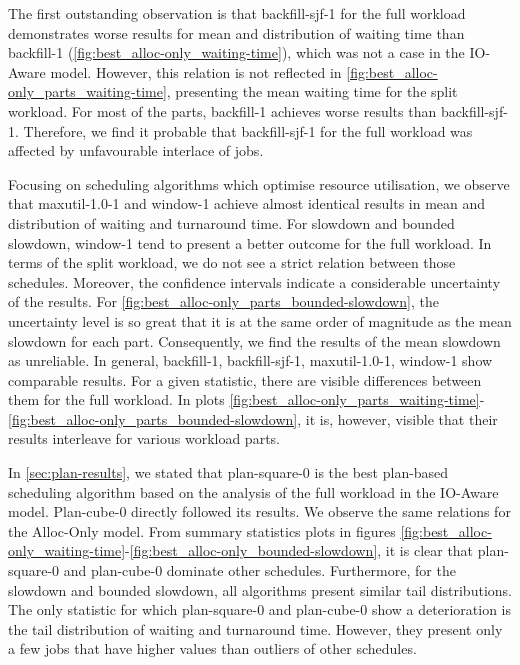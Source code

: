 \documentclass[thesis-en.tex]{subfiles}
\begin{document}
The first outstanding observation is that backfill-sjf-1 for the full workload demonstrates worse results for mean and distribution of waiting time than backfill-1 (\autoref{fig:best_alloc-only_waiting-time}), which was not a case in the IO-Aware model. However, this relation is not reflected in \autoref{fig:best_alloc-only_parts_waiting-time}, presenting the mean waiting time for the split workload. For most of the parts, backfill-1 achieves worse results than backfill-sjf-1. Therefore, we find it probable that backfill-sjf-1 for the full workload was affected by unfavourable interlace of jobs.

Focusing on scheduling algorithms which optimise resource utilisation, we observe that maxutil-1.0-1 and window-1 achieve almost identical results in mean and distribution of waiting and turnaround time. For slowdown and bounded slowdown, window-1 tend to present a better outcome for the full workload. In terms of the split workload, we do not see a strict relation between those schedules. Moreover, the confidence intervals indicate a considerable uncertainty of the results. For \autoref{fig:best_alloc-only_parts_bounded-slowdown}, the uncertainty level is so great that it is at the same order of magnitude as the mean slowdown for each part. Consequently, we find the results of the mean slowdown as unreliable. In general, backfill-1, backfill-sjf-1, maxutil-1.0-1, window-1 show comparable results. For a given statistic, there are visible differences between them for the full workload. In plots \ref{fig:best_alloc-only_parts_waiting-time}-\ref{fig:best_alloc-only_parts_bounded-slowdown}, it is, however, visible that their results interleave for various workload parts.

In \autoref{sec:plan-results}, we stated that plan-square-0 is the best plan-based scheduling algorithm based on the analysis of the full workload in the IO-Aware model. Plan-cube-0 directly followed its results. We observe the same relations for the Alloc-Only model. From summary statistics plots in figures \ref{fig:best_alloc-only_waiting-time}-\ref{fig:best_alloc-only_bounded-slowdown}, it is clear that plan-square-0 and plan-cube-0 dominate other schedules. Furthermore, for the slowdown and bounded slowdown, all algorithms present similar tail distributions. The only statistic for which plan-square-0 and plan-cube-0 show a deterioration is the tail distribution of waiting and turnaround time. However, they present only a few jobs that have higher values than outliers of other schedules.
\end{document}
